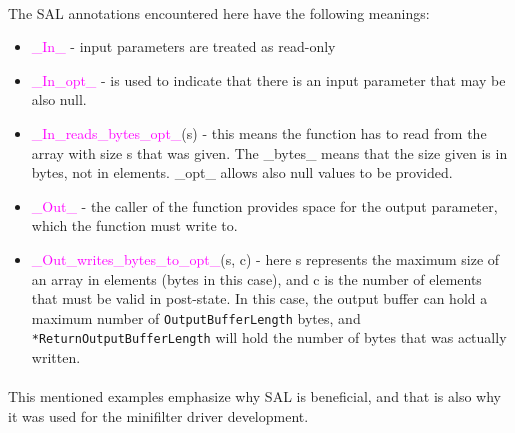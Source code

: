 		\newpage 
		\paragraph{}
		The SAL annotations encountered here have the following meanings:
		\begin{itemize}
			\item \textcolor{magenta}{\_In\_} - input parameters are treated as read-only 
			\item \textcolor{magenta}{\_In\_opt\_} - is used to indicate that there is an input parameter that may be also null.
			\item \textcolor{magenta}{\_In\_reads\_bytes\_opt\_}(s) - this means the function has to read from the array with size s that was given. The \_bytes\_ means that the size given is in bytes, not in elements. \_opt\_ allows also null values to be provided.
			\item \textcolor{magenta}{\_Out\_} - the caller of the function provides space for the output parameter, which the function must write to.
			\item \textcolor{magenta}{\_Out\_writes\_bytes\_to\_opt\_}(s, c) - here s represents the maximum size of an array in elements (bytes in this case), and c is the number of elements that must be valid in post-state. In this case, the output buffer can hold a maximum number of \texttt{OutputBufferLength} bytes, and \texttt{*ReturnOutputBufferLength} will hold the number of bytes that was actually written.
		\end{itemize}
		
		\paragraph{}
		This mentioned examples emphasize why SAL is beneficial, and that is also why it was used for the minifilter driver development.
	